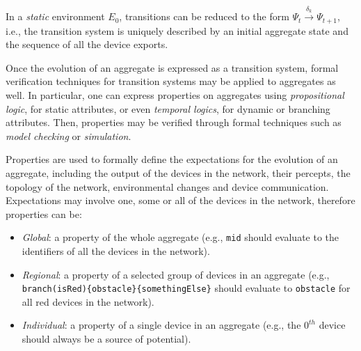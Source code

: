 In a \textit{static} environment $E_0$, transitions can be reduced to the form
$\Psi_{t} \xrightarrow{\delta_{k}} \Psi_{t+1}$, i.e., the transition system is
uniquely described by an initial aggregate state and the sequence of all the
device exports.

Once the evolution of an aggregate is expressed as a transition system, formal
verification techniques for transition systems may be applied to aggregates as
well. In particular, one can express properties on aggregates using
\textit{propositional logic}, for static attributes, or even \textit{temporal
logics}, for dynamic or branching attributes. Then, properties may be verified
through formal techniques such as \textit{model checking} or
\textit{simulation}.

Properties are used to formally define the expectations for the evolution of an
aggregate, including the output of the devices in the network, their percepts,
the topology of the network, environmental changes and device communication.
Expectations may involve one, some or all of the devices in the network,
therefore properties can be:
\begin{itemize}
  \item \textit{Global}: a property of the whole aggregate (e.g., \texttt{mid}
        should evaluate to the identifiers of all the devices in the network).
  \item \textit{Regional}: a property of a selected group of devices in an
        aggregate (e.g., \texttt{branch(isRed)\{obstacle\}\{somethingElse\}}
        should evaluate to \texttt{obstacle} for all red devices in the
        network).
  \item \textit{Individual}: a property of a single device in an aggregate
        (e.g., the $0^{th}$ device should always be a source of potential).
\end{itemize}
